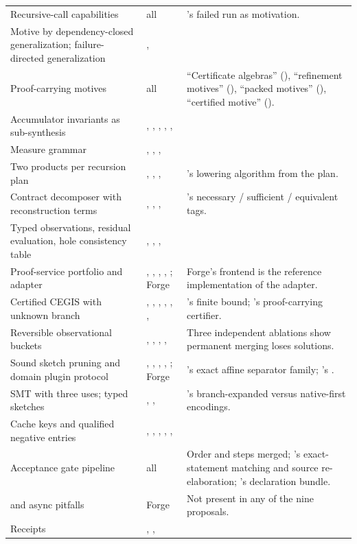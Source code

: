 {\begin{longtable}{@{}L{4.3cm}L{2.3cm}L{8.5cm}@{}}
Recursive-call capabilities & all & 's failed run as motivation. \\
Motive by dependency-closed generalization; failure-directed generalization & ,  & \\
Proof-carrying motives & all & ``Certificate algebras'' (), ``refinement motives'' (), ``packed motives'' (), ``certified motive'' (). \\
Accumulator invariants as sub-synthesis & , , , , ,  & \\
Measure grammar & , , ,  & \\
Two products per recursion plan & , , ,  & 's lowering algorithm from the plan. \\
Contract decomposer with reconstruction terms & , , ,  & 's necessary / sufficient / equivalent tags. \\
Typed observations, residual evaluation, hole consistency table & , , ,  & \\
Proof-service portfolio and adapter & , , , , ; Forge & Forge's frontend is the reference implementation of the adapter. \\
Certified CEGIS with unknown branch & , , , , , ,  & 's finite bound; 's proof-carrying certifier. \\
Reversible observational buckets & , , , ,  & Three independent ablations show permanent merging loses solutions. \\
Sound sketch pruning and domain plugin protocol & , , , , ; Forge & 's exact affine separator family; 's . \\
SMT with three uses; typed sketches & , ,  & 's branch-expanded versus native-first encodings. \\
Cache keys and qualified negative entries & , , , , ,  & \\
Acceptance gate pipeline & all & Order and steps merged; 's exact-statement matching and source re-elaboration; 's declaration bundle. \\
 and async  pitfalls & Forge & Not present in any of the nine proposals. \\
Receipts & , ,  & \\

\end{longtable}}
